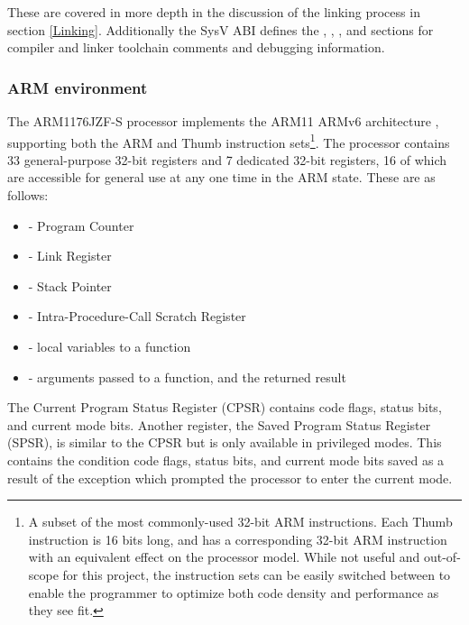         These are covered in more depth in the discussion of the linking process
        in section \ref{Linking}. Additionally the SysV ABI defines the
        , , , and 
        sections for compiler and linker toolchain comments and debugging
        information.

    \subsubsection{ARM environment}
       The ARM1176JZF-S processor implements the ARM11 ARMv6 architecture
       \cite{TRM}, supporting both the ARM and Thumb instruction sets\footnote{A
       subset of the most commonly-used 32-bit ARM instructions.  Each Thumb
       instruction is 16 bits long, and has a corresponding 32-bit ARM
       instruction with an equivalent effect on the processor model. While not
       useful and out-of-scope for this project, the instruction sets can be
       easily switched between to enable the programmer to optimize both code
       density and performance as they see fit.}. The processor contains 33
       general-purpose 32-bit registers and 7 dedicated 32-bit registers, 16 of
       which are accessible for general use at any one time in the ARM state.
       These are as follows:
       \begin{itemize}
           \itemsep0em
           \item {} - Program Counter
           \item {} - Link Register
           \item {} - Stack Pointer
           \item {} - Intra-Procedure-Call Scratch Register
           \item {} - local variables to a function
           \item {} - arguments passed to a function, and the returned
               result
       \end{itemize}

       The Current Program Status Register (CPSR) contains code flags, status
       bits, and current mode bits.  Another register, the Saved Program Status
       Register (SPSR), is similar to the CPSR but is only available in
       privileged modes. This contains the condition code flags, status bits,
       and current mode bits saved as a result of the exception which prompted
       the processor to enter the current mode.

